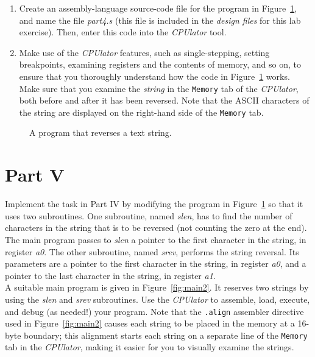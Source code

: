 \documentclass[epsfig,10pt,fullpage]{article}
\begin{document}
\setlength{\fboxsep}{1pt}
\begin{enumerate}
\item Create an assembly-language source-code file for the program in
Figure~\ref{fig:reverse}, and name the file {\it part4.s} (this file is included in 
the {\it design files} for this lab exercise). Then, enter this code into 
the {\it CPUlator} tool.
\item
Make use of the {\it CPUlator} features, such as single-stepping, setting breakpoints, 
examining registers and the contents of memory, and so on, to ensure that
you thoroughly understand how the code in Figure~\ref{fig:reverse} works.
Make sure that you examine the {\it string} in the \texttt{Memory} tab of the {\it CPUlator}, 
both before and after it has been reversed. Note that the ASCII characters of the string
are displayed on the right-hand side of the \texttt{Memory} tab.
\end{enumerate}

\begin{figure}[H]
\begin{center}

\end{center}
\caption{A program that reverses a text string.}
\label{fig:reverse}
\end{figure}

\section*{Part V}

Implement the task in Part IV by modifying the program in Figure~\ref{fig:reverse} so that it
uses two subroutines. One subroutine, named {\it slen}, has to find the number of
characters in the string that is to be reversed (not counting the zero at the
end). The main program passes to {\it slen} a pointer to the first character in the string,
in register {\it a0}.  The other subroutine, named {\it srev}, performs the string reversal. 
Its parameters are a pointer to the first character in the string, in register {\it a0}, and 
a pointer to the last character in the string, in register {\it a1}. 
~\\

\noindent
A suitable main program is given in Figure~\ref{fig:main2}. It reserves two strings by
using the {\it slen} and {\it srev} subroutines. 
Use the {\it CPUlator} to assemble, load, execute, and debug (as needed!) your program. 
Note that the \texttt{.align} assembler directive used in Figure~\ref{fig:main2}
causes each string to be placed in the memory at a 16-byte boundary; this alignment starts
each string on a separate line of the \texttt{Memory} tab in the {\it CPUlator}, making
it easier for you to visually examine the strings.
\end{document}
